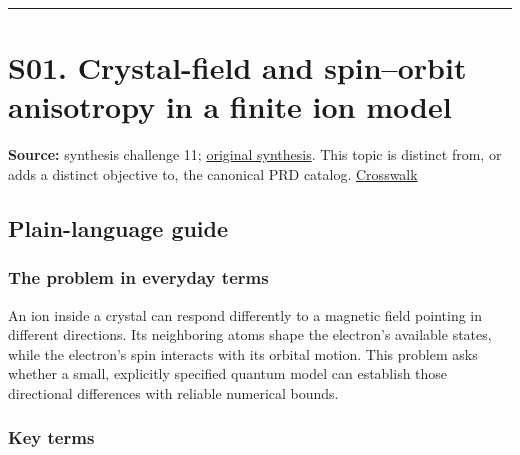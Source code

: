 \documentclass[
  11pt,
]{article}
\begin{document}
\begin{center}\rule{0.5\linewidth}{0.5pt}\end{center}

\section{S01. Crystal-field and spin--orbit anisotropy in a finite ion
model}

\textbf{Source:} synthesis challenge 11;
\href{https://github.com/rick-stevens-ai/Pure-Thought/blob/main/NOTES/30-Most-Compelling-Pure-Thought-AI-Challenges.md}{original
synthesis}. This topic is distinct from, or adds a distinct objective
to, the canonical PRD catalog.
\href{https://github.com/rick-stevens-ai/Pure-Thought/blob/main/reviews/SYNTHESIS-CROSSWALK.md}{Crosswalk}

\subsection{Plain-language guide}

\subsubsection{The problem in everyday terms}

An ion inside a crystal can respond differently to a magnetic field
pointing in different directions. Its neighboring atoms shape the
electron's available states, while the electron's spin interacts with
its orbital motion. This problem asks whether a small, explicitly
specified quantum model can establish those directional differences with
reliable numerical bounds.

\subsubsection{Key terms}
\end{document}
